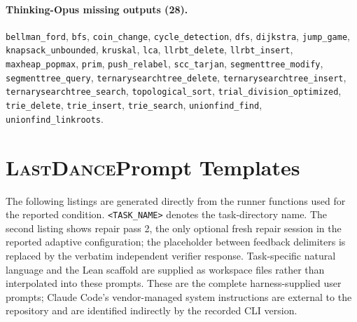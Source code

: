 \documentclass{article}
\newcommand{\task}[1]{\texttt{#1}}
\newcommand{\lastdance}{\textsc{LastDance}}
\begin{document}
\paragraph{Thinking-Opus missing outputs (28).}
\task{bellman\_ford}, \task{bfs}, \task{coin\_change}, \task{cycle\_detection},
\task{dfs}, \task{dijkstra}, \task{jump\_game}, \task{knapsack\_unbounded},
\task{kruskal}, \task{lca}, \task{llrbt\_delete}, \task{llrbt\_insert},
\task{maxheap\_popmax}, \task{prim}, \task{push\_relabel}, \task{scc\_tarjan},
\task{segmenttree\_modify}, \task{segmenttree\_query},
\task{ternarysearchtree\_delete}, \task{ternarysearchtree\_insert},
\task{ternarysearchtree\_search}, \task{topological\_sort},
\task{trial\_division\_optimized}, \task{trie\_delete}, \task{trie\_insert},
\task{trie\_search}, \task{unionfind\_find}, \task{unionfind\_linkroots}.

\section{\lastdance Prompt Templates}
\label{app:lastdance-prompts}

The following listings are generated directly from the runner functions used for the
reported condition.  \texttt{<TASK\_NAME>} denotes the task-directory name.  The second
listing shows repair pass 2, the only optional fresh repair session in the reported
adaptive configuration; the placeholder between feedback delimiters is replaced by the
verbatim independent verifier response.  Task-specific natural language and the Lean
scaffold are supplied as workspace files rather than interpolated into these prompts.
These are the complete harness-supplied user prompts; Claude Code's vendor-managed
system instructions are external to the repository and are identified indirectly by
the recorded CLI version.






\end{document}
